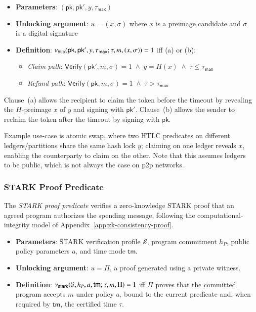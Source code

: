 \begin{itemize}
	\item \textbf{Parameters}: $(\mathsf{pk}, \mathsf{pk}', y, \tau_\mathsf{max})$
	\item \textbf{Unlocking argument}: $u = (x, \sigma)$ where $x$ is a preimage candidate and $\sigma$ is a digital signature
	\item \textbf{Definition}: $\nu_\mathsf{htlc}(\mathsf{pk}, \mathsf{pk}', y, \tau_\mathsf{max}; \tau, m, (x, \sigma)) = 1$ iff (a) or (b):
	\begin{itemize}
		\item[(a)] \emph{Claim path}: $\mathsf{Verify}(\mathsf{pk}', m, \sigma) = 1 \;\land\; y = H(x) \;\land\; \tau \le \tau_\mathsf{max}$
		\item[(b)] \emph{Refund path}: $\mathsf{Verify}(\mathsf{pk}, m, \sigma) = 1 \;\land\; \tau > \tau_\mathsf{max}$
	\end{itemize}
\end{itemize}

Clause~(a) allows the recipient to claim the token before the timeout by revealing the $H$-preimage $x$ of $y$ and signing with $\mathsf{pk}'$. Clause~(b) allows the sender to reclaim the token after the timeout by signing with $\mathsf{pk}$.

Example use-case is atomic swap, where two HTLC predicates on different ledgers/partitions share the same hash lock $y$; claiming on one ledger reveals $x$, enabling the counterparty to claim on the other. Note that this assumes ledgers to be public, which is not always the case on p2p networks.

\subsubsection{STARK Proof Predicate}\label{sec:stark-predicate}

The \emph{STARK proof predicate} verifies a zero-knowledge STARK proof that an agreed program authorizes the spending message, following the computational-integrity model of Appendix~\ref{app:zk-consistency-proof}.

\begin{itemize}
  \item \textbf{Parameters}: STARK verification profile $\mathcal{S}$, program commitment $h_P$, public policy parameters $a$, and time mode $\mathsf{tm}$.
  \item \textbf{Unlocking argument}: $u=\Pi$, a proof generated using a private witness.
  \item \textbf{Definition}: $\nu_\mathsf{stark}(\mathcal{S},h_P,a,\mathsf{tm};\tau,m,\Pi)=1$ iff $\Pi$ proves that the committed program accepts $m$ under policy $a$, bound to the current predicate and, when required by $\mathsf{tm}$, the certified time $\tau$.
\end{itemize}

